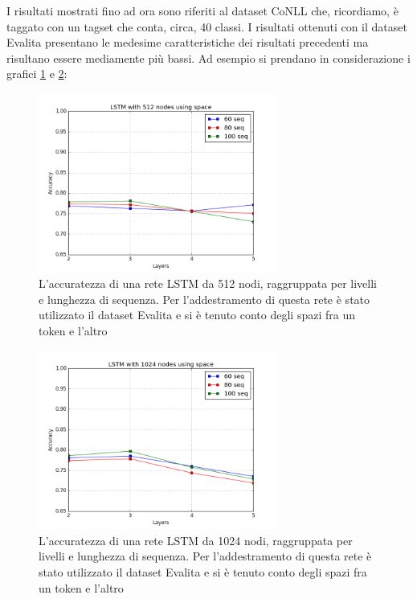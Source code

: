 I risultati mostrati fino ad ora sono riferiti al dataset CoNLL che, ricordiamo,
\`e taggato con un tagset che conta, circa, 40 classi. I risultati ottenuti con
il dataset Evalita presentano le medesime caratteristiche dei risultati precedenti
ma risultano essere mediamente pi\`u bassi. Ad esempio si prendano in considerazione
i grafici \ref{fig:accEva512sp} e \ref{fig:accEva1024sp}:

\begin{figure}[H]
  \centering
  \begin{center}
    \includegraphics[width=0.7\textwidth]{./images/plots/evalita/accuracy_512n_word_min_loss_using_spaces.png}
  \end{center}
  \caption{L'accuratezza di una rete LSTM da 512 nodi, raggruppata per livelli e
          lunghezza di sequenza. Per l'addestramento di questa rete \`e stato
          utilizzato il dataset Evalita e si \`e tenuto conto degli spazi fra un
          token e l'altro}
  \label{fig:accEva512sp}
\end{figure}

\begin{figure}[H]
  \centering
  \begin{center}
    \includegraphics[width=0.7\textwidth]{./images/plots/evalita/accuracy_1024n_word_min_loss_using_spaces.png}
  \end{center}
  \caption{L'accuratezza di una rete LSTM da 1024 nodi, raggruppata per livelli e
          lunghezza di sequenza. Per l'addestramento di questa rete \`e stato
          utilizzato il dataset Evalita e si \`e tenuto conto degli spazi fra un
          token e l'altro}
  \label{fig:accEva1024sp}
\end{figure}


